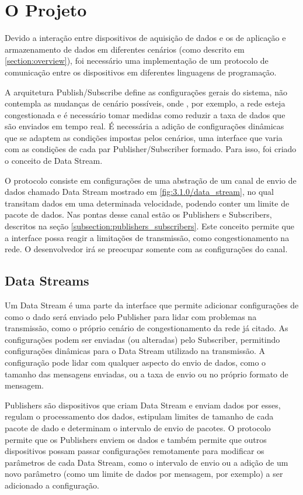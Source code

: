 \chapter{O Projeto}
\label{chapter:projeto}

Devido a interação entre dispositivos de aquisição de dados e os de aplicação e armazenamento de dados em diferentes cenários (como descrito em \ref{section:overview}), foi necessário uma implementação de um protocolo de comunicação entre os dispositivos em diferentes linguagens de programação.

A arquitetura Publish/Subscribe define as configurações gerais do sistema, não contempla as mudanças de cenário possíveis, onde , por exemplo, a rede esteja congestionada e é necessário tomar medidas como reduzir a taxa de dados que são enviados em tempo real. É necessária a adição de configurações dinâmicas que se adaptem as condições impostas pelos cenários, uma interface que varia com as condições de cada par Publisher/Subscriber formado. Para isso, foi criado o conceito de Data Stream.

O protocolo consiste em configurações de uma abstração de um canal de envio de dados chamado Data Stream mostrado em \ref{fig:3.1.0/data_stream}, no qual transitam dados em uma determinada velocidade, podendo conter um limite de pacote de dados. Nas pontas desse canal estão os Publishers e Subscribers, descritos na seção \ref{subsection:publishers_subscribers}. Este conceito permite  que a interface possa reagir a limitações de transmissão, como congestionamento na rede. O desenvolvedor irá se preocupar somente com as configurações do canal.

\section{Data Streams}
\label{section:data_stream}

Um Data Stream é uma parte da interface que permite adicionar configurações de como o dado será enviado pelo Publisher  para lidar com problemas na transmissão, como o próprio cenário de congestionamento da rede já citado. As configurações podem ser enviadas (ou alteradas) pelo Subscriber, permitindo configurações dinâmicas para o Data Stream utilizado na transmissão. A configuração pode lidar com qualquer aspecto do envio de dados, como o tamanho das mensagens enviadas, ou a taxa de envio ou no próprio formato de mensagem.


Publishers são dispositivos que criam Data Stream  e enviam dados por esses, regulam o processamento dos dados, estipulam limites de tamanho de cada pacote de dado e determinam o intervalo de envio de pacotes. O protocolo permite que os Publishers enviem os dados e também permite que outros dispositivos possam passar configurações remotamente para modificar os parâmetros de cada Data Stream, como o intervalo de envio ou a adição de um novo parâmetro (como um limite de dados por mensagem, por exemplo) a ser adicionado a configuração. 

